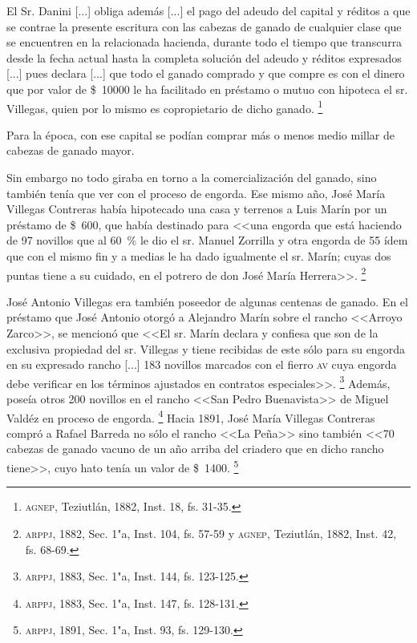 \documentclass[14pt,twoside,final]{extbook} %
\let\oldfootnote\footnote
\renewcommand\footnote[1]{%
\oldfootnote{\hspace{1mm}#1}}
\begin{document}
\begin{quoting}
El Sr. Danini [...] obliga además [...] el pago del adeudo del capital y réditos a que se contrae la presente escritura con las cabezas de ganado de cualquier clase que se encuentren en la relacionada hacienda, durante todo el tiempo que transcurra desde la fecha actual hasta la completa solución del adeudo y réditos expresados [...] pues declara [...] que todo el ganado comprado y que compre es con el dinero que por valor de \$~10000 le ha facilitado en préstamo o mutuo con hipoteca el sr. Villegas, quien por lo mismo es copropietario de dicho ganado.\footnote{\textsc{agnep}, Teziutlán, 1882, Inst. 18, fs. 31-35.}
\end{quoting}
Para la época, con ese capital se podían comprar más o menos medio millar de cabezas de ganado mayor.

Sin embargo no todo giraba en torno a la comercialización del ganado, sino también tenía que ver con el proceso de engorda. Ese mismo año, José María Villegas Contreras había hipotecado una casa y terrenos a Luis Marín por un préstamo de \$~600, que había destinado para <<una engorda que está haciendo de 97 novillos que al 60~\% le dio el sr. Manuel Zorrilla y otra engorda de 55 ídem que con el mismo fin y a medias le ha dado igualmente el sr. Marín; cuyas dos puntas tiene a su cuidado, en el potrero de don José María Herrera>>.\footnote{\textsc{arppj}, 1882, Sec. 1"a, Inst. 104, fs. 57-59 y \textsc{agnep}, Teziutlán, 1882, Inst. 42, fs. 68-69.}

José Antonio Villegas era también poseedor de algunas centenas de ganado. En el préstamo que José Antonio otorgó a Alejandro Marín sobre el rancho <<Arroyo Zarco>>, se mencionó que <<El sr. Marín declara y confiesa que son de la exclusiva propiedad del sr. Villegas y tiene recibidas de este sólo para su engorda en su expresado rancho [...] 183 novillos marcados con el fierro \textsc{av} cuya engorda debe verificar en los términos ajustados en contratos especiales>>.\footnote{\textsc{arppj}, 1883, Sec. 1"a, Inst. 144, fs. 123-125.} Además, poseía otros 200 novillos en el rancho <<San Pedro Buenavista>> de Miguel Valdéz en proceso de engorda.\footnote{\textsc{arppj}, 1883, Sec. 1"a, Inst. 147, fs. 128-131.} Hacia 1891, José María Villegas Contreras compró a Rafael Barreda no sólo el rancho <<La Peña>> sino también <<70 cabezas de ganado vacuno de un año arriba del criadero que en dicho rancho tiene>>, cuyo hato tenía un valor de \$~1400.\footnote{\textsc{arppj}, 1891, Sec. 1"a, Inst. 93, fs. 129-130.}
\end{document}
